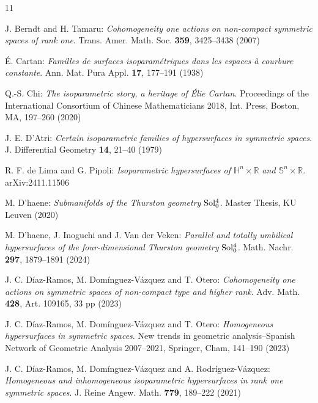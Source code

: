 \documentclass[reqno]{amsart}%
\theoremstyle{definition}
\numberwithin{equation}{section}
\begin{document}
	\normalsize\noindent
	\begin{thebibliography}{11}
		
		J. Berndt and H. Tamaru:
		{\it Cohomogeneity one actions on non-compact symmetric spaces of rank one}.
		Trans. Amer. Math. Soc. {\bf 359}, 3425--3438 (2007)
		
		\'{E}. Cartan:
		{\it Familles de surfaces isoparam\'{e}triques dans les espaces \`{a} courbure constante}.
		Ann. Mat. Pura Appl. {\bf 17}, 177--191 (1938)
		
		Q.-S. Chi:
		{\it The isoparametric story, a heritage of \'{E}lie Cartan}.
		Proceedings of the International Consortium of Chinese Mathematicians 2018,
		Int. Press, Boston, MA, 197--260 (2020)
		
		J. E. D'Atri:
		{\it Certain isoparametric families of hypersurfaces in symmetric spaces}.
		J. Differential Geometry {\bf 14}, 21--40 (1979)
		
		R. F. de Lima and G. Pipoli:
		{\it Isoparametric hypersurfaces of $\mathbb{H}^n\times\mathbb{R}$ and $\mathbb{S}^n\times\mathbb{R}$}.
		arXiv:2411.11506
		
		M. D'haene:
		{\it Submanifolds of the Thurston geometry ${\rm Sol_0^4}$}.
		Master Thesis, KU Leuven (2020)
		
		M. D'haene, J. Inoguchi and J. Van der Veken:
		{\it Parallel and totally umbilical hypersurfaces
			of the four-dimensional Thurston geometry ${\rm Sol_0^4}$}.
		Math. Nachr. {\bf 297}, 1879--1891 (2024)
		
		J. C. D\'{i}az-Ramos, M. Dom\'{i}nguez-V\'{a}zquez and T. Otero:
		{\it Cohomogeneity one actions on symmetric spaces of non-compact type and higher rank}.
		Adv. Math. {\bf 428}, Art. 109165, 33 pp (2023)
		
		J. C. D\'{i}az-Ramos, M. Dom\'{i}nguez-V\'{a}zquez and T. Otero:
		{\it Homogeneous hypersurfaces in symmetric spaces}.
		New trends in geometric analysis--Spanish Network of Geometric Analysis 2007--2021, Springer, Cham, 141--190 (2023)
		
		J. C. D\'{i}az-Ramos, M. Dom\'{i}nguez-V\'{a}zquez and A. Rodr\'{i}guez-V\'{a}zquez:
		{\it Homogeneous and inhomogeneous isoparametric hypersurfaces in rank one symmetric spaces}.
		J. Reine Angew. Math. {\bf 779}, 189--222 (2021)
		

\end{thebibliography}
\end{document}
